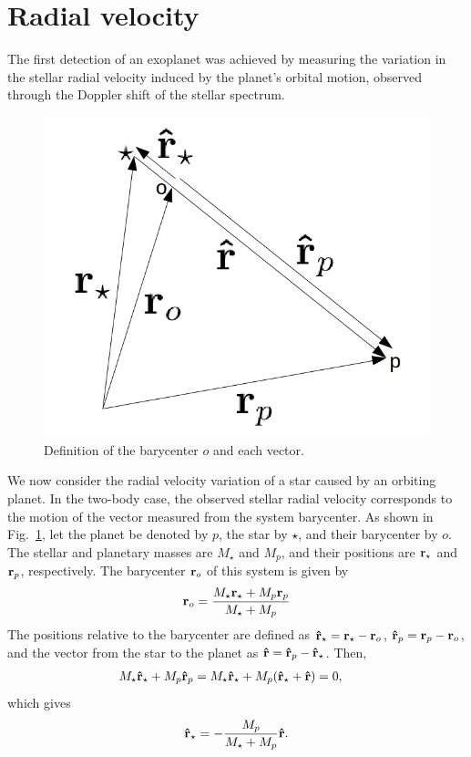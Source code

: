 \section{Radial velocity}

The first detection of an exoplanet was achieved by measuring the variation in the stellar radial velocity induced by the planet’s orbital motion, observed through the Doppler shift of the stellar spectrum.

\begin{figure}[]
\begin{center}
\includegraphics[bb=0 0 648 537,width=1.0\linewidth]{fig/rvector.png}
\end{center}
\caption{Definition of the barycenter $o$ and each vector.\label{fig:rvector}}
\end{figure}

We now consider the radial velocity variation of a star caused by an orbiting planet. In the two-body case, the observed stellar radial velocity corresponds to the motion of the vector measured from the system barycenter. As shown in Fig.~\ref{fig:rvector}, let the planet be denoted by $p$, the star by $\star$, and their barycenter by $o$. The stellar and planetary masses are $M_\star$ and $M_p$, and their positions are ${\bf r}_\star$ and ${\bf r}_p$, respectively. The barycenter ${\bf r}_o$ of this system is given by
\begin{eqnarray}
{\bf r}_o = \frac{M_\star {\bf r}_\star+ M_p {\bf r}_p}{M_\star + M_p}
\label{eq:rbary}
\end{eqnarray}
The positions relative to the barycenter are defined as ${\bf \hat{r}}_\star = {\bf r}_\star - {\bf r}_o$, ${\bf \hat{r}}_p = {\bf r}_p - {\bf r}_o$, and the vector from the star to the planet as ${\bf \hat{r}} = {\bf \hat{r}}_p - {\bf \hat{r}}_\star$. Then,
\begin{align}
\label{eq:barycentsp}
M_\star {\bf \hat{r}}_\star + M_p {\bf \hat{r}}_p &= M_\star {\bf \hat{r}}_\star + M_p ({\bf \hat{r}}_\star + {\bf \hat{r}} ) = 0 ,
\end{align}
which gives
\begin{eqnarray}
\label{eq:relpossp}
{\bf \hat{r}}_\star = - \frac{M_p}{M_\star + M_p} {\bf \hat{r}} .
\end{eqnarray}

